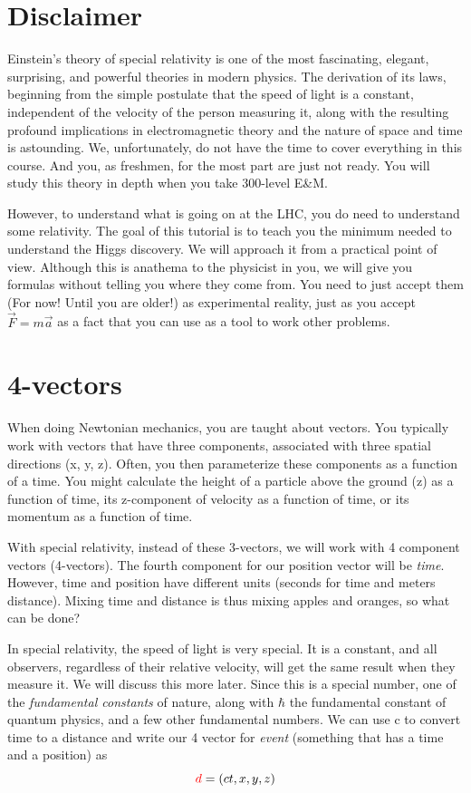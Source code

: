  \section{Disclaimer}

Einstein's theory of special relativity is one of the most fascinating, elegant, surprising, and powerful theories in modern physics.  The derivation of its laws, beginning from the simple postulate that the speed of light is a constant, independent of the velocity of the person measuring it, along with the resulting profound implications in electromagnetic theory and the nature of space and time is astounding. We, unfortunately, do not have the time to cover everything in this course.  And you, as freshmen, for the most part are just not ready.  You will study this theory in depth when you take 300-level E\&M.

However, to understand what is going on at the LHC, you do need to understand some relativity.  The goal of this tutorial is to teach you the minimum needed to understand the Higgs discovery.  We will approach it from a practical point of view. Although this is anathema to the physicist in you, we will give you formulas without telling you where they come from.  You need to just accept them (For now! Until you are older!) as experimental reality, just as you accept $\vec{F}=m\vec{a}$  as a fact that you can use as a tool to work other problems.

\section{4-vectors}

When doing Newtonian mechanics, you are taught about vectors.  You typically work with vectors that have three components, associated with three spatial directions (x, y, z).  Often, you then parameterize these components as a function of a time.  You might calculate the height of a particle above the ground (z) as a function of time, its z-component of velocity as a function of time, or its momentum as a function of time.

With special relativity, instead of these 3-vectors, we will work with 4 component vectors (4-vectors).  The fourth component for our position vector will be {\it time}.  However, time and position have different units (seconds for time and meters distance).  Mixing time and distance is thus mixing apples and oranges, so what can be done?

In special relativity, the speed of light is very special.  It is a constant, and all observers, regardless of their relative velocity, will get the same result when they measure it. We will discuss this more later.  Since this is a special number, one of the {\it fundamental constants} of nature, along with  $\hbar$ the fundamental constant of quantum physics, and a few other fundamental numbers.  We can use c to convert time to a distance and write our 4 vector for {\it event} (something that has a time and a position) as
\begin{equation}
	  {\color{red} d}=(ct,x,y,z)
\end{equation}

